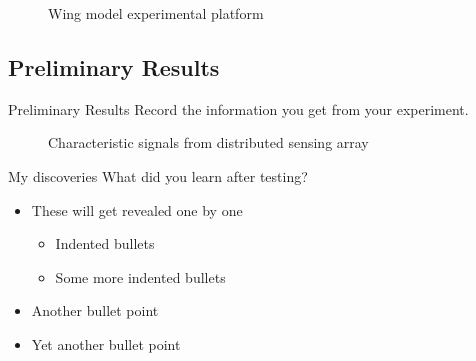 \documentclass[aspectratio=169]{beamer}            %
\begin{document}
\begin{frame}[plain]
  \begin{figure}[!htb]
    \centering
    
    \caption{Wing model experimental platform}
    \label{Fig:ExpPlatform}
  \end{figure}
\end{frame}

\subsection[Preliminary Results]{Preliminary Results}
\begin{frame}[plain]{Preliminary Results}
  Record the information you get from your experiment.
	
  \begin{figure}[!htb]
    \centering
    \qquad
    \caption{Characteristic signals from distributed sensing array}
    \label{Fig:CharSignals}
  \end{figure}

\end{frame}

\begin{frame}{My discoveries}
  What did you learn after testing?
  \begin{itemize}[<+->]
    \item These will get revealed one by one
      \begin{itemize}
	\item Indented bullets
	\item Some more indented bullets
      \end{itemize}
    \item Another bullet point
    \item Yet another bullet point
  \end{itemize}
\end{frame}
\end{document}
